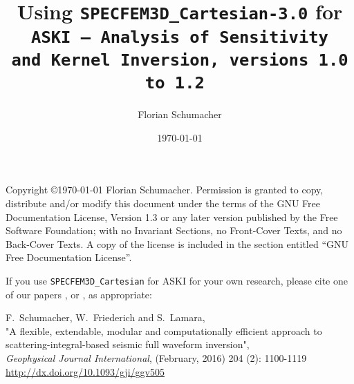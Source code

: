 \documentclass[12pt,a4paper]{article}
\newcommand{\lcode}[1]{\nolinkurl{#1}}
\newcommand{\ASKI}{ {\ttfamily ASKI} }
\begin{document}
\sloppy
%
\setlength{\parindent}{0cm}
\addtolength{\parskip}{0.5em}
%
%
%
\title{Using {\tt \Huge SPECFEM3D\_Cartesian-3.0} for \\ \tt {\Huge ASKI} {\rm--} {\Huge A}{\large nalysis of} {\Huge S}{\large ensitivity \\ and} {\Huge\tt K}{\large ernel} {\Huge\tt I}{\large nversion, versions 1.0 to 1.2} }
\author[1]{Florian Schumacher}
\date{\mydate \today}
\maketitle
%
Copyright \copyright {\myyear \today} Florian Schumacher.
Permission is granted to copy, distribute and/or modify this document
under the terms of the GNU Free Documentation License, Version 1.3
or any later version published by the Free Software Foundation;
with no Invariant Sections, no Front-Cover Texts, and no Back-Cover Texts.
A copy of the license is included in the section entitled ``GNU
Free Documentation License''.

\vspace{0.7cm}

If you use \lcode{SPECFEM3D_Cartesian} for \ASKI{} for your own research, please cite 
one of our papers \cite{Schumacher16}, or \cite{Schumacher16b}, as appropriate:

F.\ Schumacher, W.\ Friederich and S.\ Lamara, \\
"A flexible, extendable, modular and 
computationally efficient approach to scattering-integral-based seismic full waveform 
inversion", \\
\emph{Geophysical Journal International}, (February, 2016) 204 (2): 1100-1119\\
\url{http://dx.doi.org/10.1093/gji/ggv505}
\end{document}
